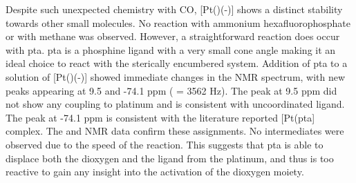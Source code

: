 Despite such unexpected chemistry with CO, [Pt(\tButhixantphos)(-)] shows a distinct stability towards other small molecules.  No reaction with ammonium hexafluorophosphate or with methane was observed.  However, a straightforward reaction does occur with \gls{pta}.  \Gls{pta} is a phosphine ligand with a very small cone angle making it an ideal choice to react with the sterically encumbered system.\cite{Phillips2004}  Addition of \gls{pta} to a solution of [Pt(\tButhixantphos)(-)] showed immediate changes in the \phosphorus{} NMR spectrum, with new peaks appearing at 9.5 and -74.1 ppm (\JPtP{} = 3562 Hz).  The peak at 9.5 ppm did not show any coupling to platinum and is consistent with uncoordinated \tButhixantphos{} ligand.  The peak at -74.1 ppm is consistent with the literature reported [Pt(\gls{pta}] complex.\cite{Darensbourg1997}  The \proton{} and \carbon{} NMR data confirm these assignments.  No intermediates were observed due to the speed of the reaction.  This suggests that \gls{pta} is able to displace both the dioxygen and the \tButhixantphos{} ligand from the platinum, and thus is too reactive to gain any insight into the activation of the dioxygen moiety.  
%
%
%
%
%  
